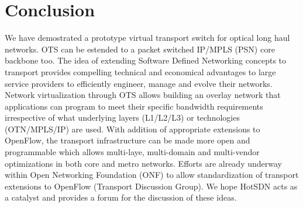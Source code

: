 \documentclass{sig-alternate-10pt}
\begin{document}
\section{Conclusion}
	We have demostrated a prototype virtual transport switch for optical long haul networks. OTS can be
	estended to a packet switched IP/MPLS (PSN) core backbone too. The idea of extending Software Defined
	Networking concepts to transport provides compelling technical and economical advantages to large service
	providers to efficiently engineer, manage and evolve their networks. Network virtualization through OTS
	allows building an overlay network that applications can program to meet their specific bandwidth
	requirements irrespective of what underlying layers (L1/L2/L3) or technologies (OTN/MPLS/IP) are used.
	With addition of appropriate extensions to OpenFlow, the transport infrastructure can be made more open
	and programmable which allows multi-laye, multi-domain and multi-vendor optimizations in both core and
	metro networks. Efforts are already underway within Open Networking Foundation (ONF) to allow
	standardization of transport extensions to OpenFlow (Transport Discussion Group). We hope HotSDN acts as
	a catalyst and provides a forum for the discussion of these ideas.


 
\end{document}
